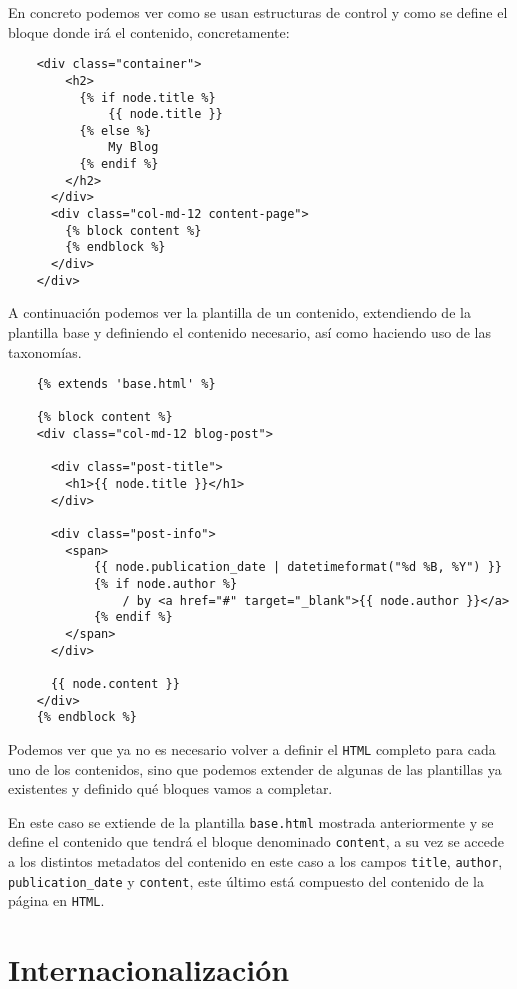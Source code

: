 En concreto podemos ver como se usan estructuras de control y como se define el bloque donde irá el contenido,
concretamente:

\begin{verbatim}
    <div class="container">
        <h2>
          {% if node.title %}
              {{ node.title }}
          {% else %}
              My Blog
          {% endif %}
        </h2>
      </div>
      <div class="col-md-12 content-page">
        {% block content %}
        {% endblock %}
      </div>
    </div>
\end{verbatim}

A continuación podemos ver la plantilla de un contenido, extendiendo de la plantilla base y definiendo
el contenido necesario, así como haciendo uso de las taxonomías.

\begin{verbatim}
    {% extends 'base.html' %}

    {% block content %}
    <div class="col-md-12 blog-post">

      <div class="post-title">
        <h1>{{ node.title }}</h1>
      </div>

      <div class="post-info">
        <span>
            {{ node.publication_date | datetimeformat("%d %B, %Y") }}
            {% if node.author %}
                / by <a href="#" target="_blank">{{ node.author }}</a>
            {% endif %}
        </span>
      </div>

      {{ node.content }}
    </div>
    {% endblock %}
\end{verbatim}

Podemos ver que ya no es necesario volver a definir el \texttt{HTML} completo para cada uno de los
contenidos, sino que podemos extender de algunas de las plantillas ya existentes y definido qué
bloques vamos a completar.

En este caso se extiende de la plantilla \texttt{base.html} mostrada anteriormente y se define el
contenido que tendrá el bloque denominado \texttt{content}, a su vez se accede a los distintos
metadatos del contenido en este caso a los campos \texttt{title}, \texttt{author},
\texttt{publication\_date} y \texttt{content}, este último está compuesto del contenido de la página
en \texttt{HTML}.


\section{Internacionalización}

